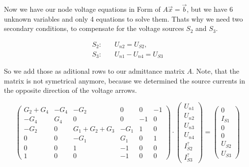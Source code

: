 \documentclass[a4paper]{article}
\begin{document}
{Now we have our node voltage equations in Form of $A \vec{x} = \vec{b}$, but we have 6 unknown
variables and only 4 equations to solve them. Thats why we need two secondary conditions, to
compensate for the voltage sources $S_2$ and $S_3$.

\begin{align*}
   S_2: \quad &U_{n2} = U_{S2}, \\ 
   S_3: \quad &U_{n1} - U_{n4} = U_{S3}
\end{align*}

So we add those as aditional rows to our admittance matrix $A$. Note, that the matrix is not
symetrical anymore, because we determined the source currents in the opposite direction of the
voltage arrows. 

\begin{equation}
\begin{pmatrix}
   G_2 + G_4 & -G_4 & -G_2 & 0 & 0 & -1 \\
   -G_4 & G_4 & 0 & 0 & -1 & 0 \\
   -G_2 & 0 & G_1+G_2+G_3 & -G_1 & 1 & 0 \\
   0 & 0 & -G_1 & G_1 & 0 & 1 \\ 
   0 & 0 & 1 & -1 & 0 & 0 \\
   1 & 0 & 0 & -1 & 0 & 0 
\end{pmatrix}
\cdot
\begin{pmatrix}
   U_{n1} \\ U_{n2} \\ U_{n3} \\ U_{n4} \\ I_{S2}^? \\ I_{S3}^?
\end{pmatrix}
=
\begin{pmatrix}
   0 \\ I_{S1} \\ 0 \\ 0 \\ U_{S2} \\ U_{S3} 
\end{pmatrix}
\label{eqn:nodes_currents_src}
\end{equation}

}
\end{document}
